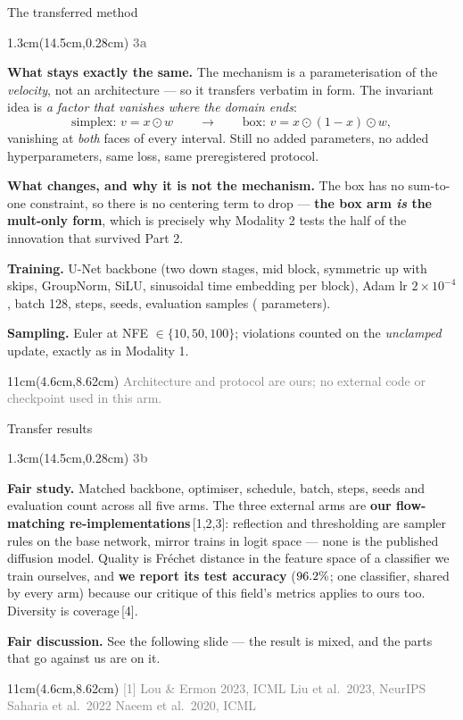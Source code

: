 \documentclass[aspectratio=169,10pt]{beamer}
\newcommand{\lab}[1]{%
  \begin{textblock*}{1.3cm}(14.5cm,0.28cm)
    \raggedleft\bfseries\small\textcolor{gray}{#1}
  \end{textblock*}}
\newcommand{\srcs}[1]{%
  \begin{textblock*}{11cm}(4.6cm,8.62cm)
    \raggedleft\fontsize{4.8}{5.6}\selectfont\textcolor{gray}{#1}
  \end{textblock*}}
\begin{document}

\begin{frame}{The transferred method}
\lab{3a}
\textbf{What stays exactly the same.} The mechanism is a parameterisation of the
\emph{velocity}, not an architecture --- so it transfers verbatim in form. The invariant idea is
\emph{a factor that vanishes where the domain ends}:
\[
\text{simplex: } v = x \odot w \qquad \longrightarrow \qquad
\text{box: } v = x \odot (1-x) \odot w ,
\]
vanishing at \emph{both} faces of every interval. Still no added parameters, no added
hyperparameters, same loss, same preregistered protocol.

\medskip
\textbf{What changes, and why it is not the mechanism.} The box has no sum-to-one constraint, so
there is no centering term to drop --- \textbf{the box arm \emph{is} the mult-only form}, which
is precisely why Modality 2 tests the half of the innovation that survived Part 2.

\medskip
\textbf{Training.} U-Net backbone (two down stages, mid block, symmetric up with skips,
GroupNorm, SiLU, sinusoidal time embedding per block), Adam lr $2{\times}10^{-4}$, batch 128,
\MTwoSteps{} steps, \MTwoSeeds{} seeds, \MTwoEval{} evaluation samples (\MTwoParams{} parameters).

\medskip
\textbf{Sampling.} Euler at NFE $\in \{10,50,100\}$; violations counted on the \emph{unclamped}
update, exactly as in Modality 1.
\srcs{Architecture and protocol are ours; no external code or checkpoint used in this arm.}
\end{frame}

\begin{frame}{Transfer results}
\lab{3b}
\begin{center}\tiny\end{center}
\textbf{Fair study.} Matched backbone, optimiser, schedule, batch, steps, seeds and evaluation
count across all five arms. The three external arms are \textbf{our flow-matching
re-implementations}\,[1,2,3]: reflection and thresholding are sampler rules on the base network,
mirror trains in logit space --- none is the published diffusion model. Quality is Fr\'echet distance in the feature space of a
classifier we train ourselves, and \textbf{we report its test accuracy} ($96.2\%$; one classifier, shared by every arm) because our critique of this field's metrics applies to ours too. Diversity is coverage\,[4].

\medskip
\textbf{Fair discussion.} See the following slide --- the result is mixed, and the parts that go
against us are on it.
\srcs{[1] Lou \& Ermon 2023, ICML \quad [2] Liu et al.\ 2023, NeurIPS \quad [3] Saharia et al.\ 2022 \quad [4] Naeem et al.\ 2020, ICML}
\end{frame}
\end{document}
